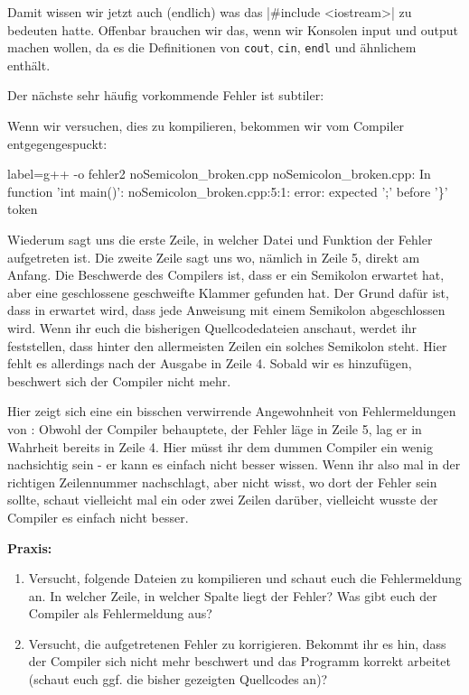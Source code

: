 Damit wissen wir jetzt auch (endlich) was das |#include <iostream>|
zu bedeuten hatte. Offenbar brauchen wir das, wenn wir Konsolen input und
output machen wollen, da es die Definitionen von \texttt{cout}, \texttt{cin},
\texttt{endl} und ähnlichem enthält.

Der nächste sehr häufig vorkommende Fehler ist subtiler:


Wenn wir versuchen, dies zu kompilieren, bekommen wir vom Compiler
entgegengespuckt:

\begin{textcode*}{label=g++ -o fehler2 noSemicolon\_broken.cpp}
    noSemicolon\_broken.cpp: In function 'int main()':
    noSemicolon\_broken.cpp:5:1: error: expected ';' before '\}' token
\end{textcode*}

Wiederum sagt uns die erste Zeile, in welcher Datei und Funktion der Fehler
aufgetreten ist. Die zweite Zeile sagt uns wo, nämlich in Zeile 5, direkt am
Anfang. Die Beschwerde des Compilers ist, dass er ein Semikolon erwartet hat,
aber eine geschlossene geschweifte Klammer gefunden hat. Der Grund dafür ist,
dass in \Cpp erwartet wird, dass jede Anweisung mit einem Semikolon abgeschlossen
wird.  Wenn ihr euch die bisherigen Quellcodedateien anschaut, werdet ihr
feststellen, dass hinter den allermeisten Zeilen ein solches Semikolon steht.
Hier fehlt es allerdings nach der Ausgabe in Zeile 4. Sobald wir es hinzufügen,
beschwert sich der Compiler nicht mehr.

Hier zeigt sich eine ein bisschen verwirrende Angewohnheit von Fehlermeldungen
von \Cpp: Obwohl der Compiler behauptete, der Fehler läge in Zeile 5, lag er in
Wahrheit bereits in Zeile 4. Hier müsst ihr dem dummen Compiler ein wenig
nachsichtig sein - er kann es einfach nicht besser wissen. Wenn ihr also mal in
der richtigen Zeilennummer nachschlagt, aber nicht wisst, wo dort der Fehler
sein sollte, schaut vielleicht mal ein oder zwei Zeilen darüber, vielleicht
wusste der Compiler es einfach nicht besser.

\textbf{Praxis:}
\begin{enumerate}
    \item Versucht, folgende Dateien zu kompilieren und schaut euch die
        Fehlermeldung an. In welcher Zeile, in welcher Spalte liegt der Fehler?
        Was gibt euch der Compiler als Fehlermeldung aus?
    \item Versucht, die aufgetretenen Fehler zu korrigieren. Bekommt ihr es
        hin, dass der Compiler sich nicht mehr beschwert und das Programm
        korrekt arbeitet (schaut euch ggf. die bisher gezeigten Quellcodes an)?
\end{enumerate}

